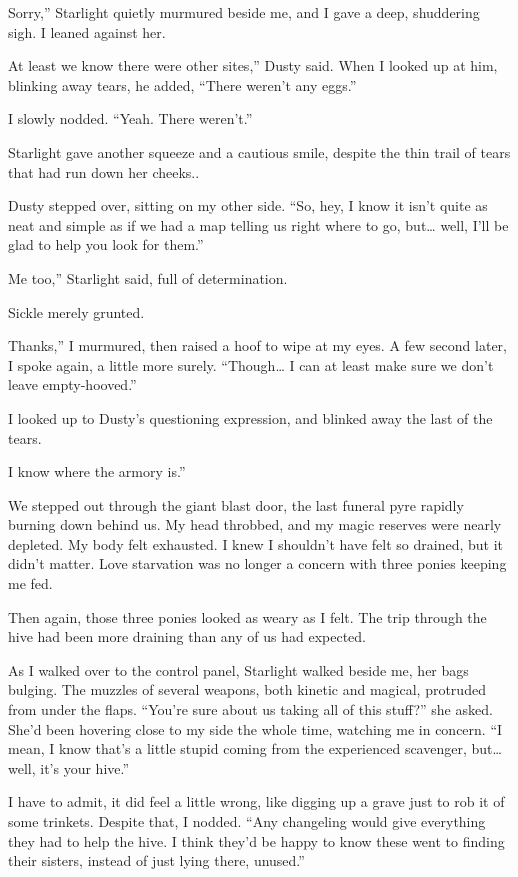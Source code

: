 \leavevmode{}Sorry,” Starlight quietly murmured beside me, and I gave a deep, shuddering sigh. I leaned against her.

\leavevmode{}At least we know there were other sites,” Dusty said. When I looked up at him, blinking away tears, he added, “There weren’t any eggs.”

I slowly nodded. “Yeah. There weren’t.”

Starlight gave another squeeze and a cautious smile, despite the thin trail of tears that had run down her cheeks..

Dusty stepped over, sitting on my other side. “So, hey, I know it isn’t quite as neat and simple as if we had a map telling us right where to go, but… well, I’ll be glad to help you look for them.”

\leavevmode{}Me too,” Starlight said, full of determination.

Sickle merely grunted.

\leavevmode{}Thanks,” I murmured, then raised a hoof to wipe at my eyes. A few second later, I spoke again, a little more surely. “Though… I can at least make sure we don’t leave empty-hooved.”

I looked up to Dusty’s questioning expression, and blinked away the last of the tears.

\leavevmode{}I know where the armory is.”

{\br}%
We stepped out through the giant blast door, the last funeral pyre rapidly burning down behind us. My head throbbed, and my magic reserves were nearly depleted. My body felt exhausted. I knew I shouldn’t have felt so drained, but it didn’t matter. Love starvation was no longer a concern with three ponies keeping me fed.

Then again, those three ponies looked as weary as I felt. The trip through the hive had been more draining than any of us had expected.

As I walked over to the control panel, Starlight walked beside me, her bags bulging. The muzzles of several weapons, both kinetic and magical, protruded from under the flaps. “You’re sure about us taking all of this stuff?” she asked. She’d been hovering close to my side the whole time, watching me in concern. “I mean, I know that’s a little stupid coming from the experienced scavenger, but… well, it’s your hive.”

I have to admit, it did feel a little wrong, like digging up a grave just to rob it of some trinkets. Despite that, I nodded. “Any changeling would give everything they had to help the hive. I think they’d be happy to know these went to finding their sisters, instead of just lying there, unused.”

